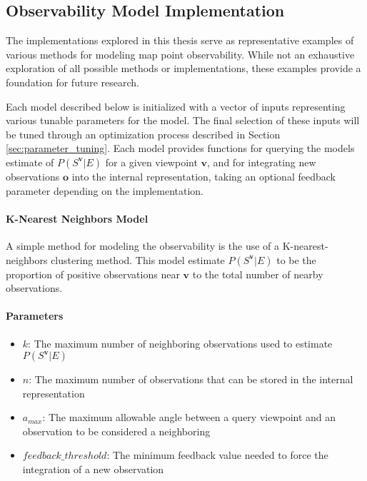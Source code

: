 \subsection{Observability Model Implementation}

The implementations explored in this thesis serve as representative examples of various methods for modeling map point observability. While not an exhaustive exploration of all possible methods or implementations, these examples provide a foundation for future research.

Each model described below is initialized with a vector of inputs representing various tunable parameters for the model. The final selection of these inputs will be tuned through an optimization process described in Section \ref{sec:parameter_tuning}. Each model provides functions for querying the models estimate of $P(S^{\boldsymbol{v}}|E)$ for a given viewpoint $\boldsymbol{v}$, and for integrating new observations $\boldsymbol{o}$ into the internal representation, taking an optional feedback parameter depending on the implementation.

\paragraph{K-Nearest Neighbors Model}

A simple method for modeling the observability is the use of a K-nearest-neighbors clustering method. This model estimate $P(S^{\boldsymbol{v}}|E)$ to be the proportion of positive observations near $\boldsymbol{v}$ to the total number of nearby observations.

\begin{singlespace}
    \paragraph{Parameters}
    \begin{itemize}
        \item $k$: The maximum number of neighboring observations used to estimate $P(S^{\boldsymbol{v}}|E)$
        \item $n$: The maximum number of observations that can be stored in the internal representation
        \item $a_{max}$: The maximum allowable angle between a query viewpoint and an observation to be considered a neighboring
        \item $feedback\_threshold$: The minimum feedback value needed to force the integration of a new observation
    \end{itemize}
\end{singlespace}

